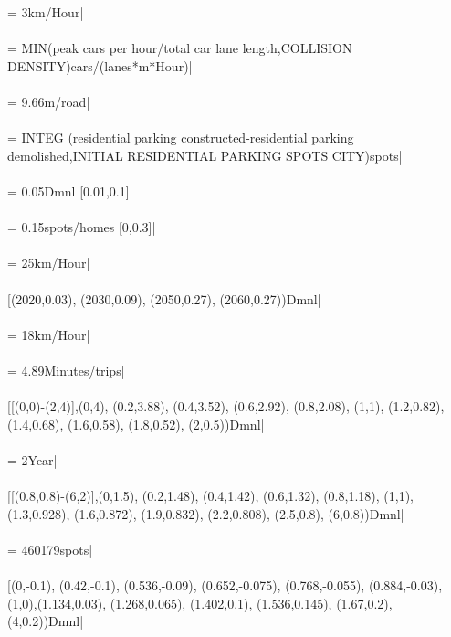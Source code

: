  = 3km/Hour| \\ \\ 
 = MIN(peak cars per hour/total car lane length,COLLISION DENSITY)cars/(lanes*m*Hour)| \\ \\ 
 = 9.66m/road| \\ \\ 
 =  INTEG (residential parking constructed-residential parking demolished,INITIAL RESIDENTIAL PARKING SPOTS CITY)spots| \\ \\ 
 = 0.05Dmnl [0.01,0.1]| \\ \\ 
 = 0.15spots/homes [0,0.3]| \\ \\ 
 = 25km/Hour| \\ \\ 
 [(2020,0.03), (2030,0.09), (2050,0.27), (2060,0.27))Dmnl| \\ \\ 
 = 18km/Hour| \\ \\ 
 = 4.89Minutes/trips| \\ \\ 
 [[(0,0)-(2,4)],(0,4), (0.2,3.88), (0.4,3.52), (0.6,2.92), (0.8,2.08), (1,1), (1.2,0.82), (1.4,0.68), (1.6,0.58), (1.8,0.52), (2,0.5))Dmnl| \\ \\ 
 = 2Year| \\ \\ 
 [[(0.8,0.8)-(6,2)],(0,1.5), (0.2,1.48), (0.4,1.42), (0.6,1.32), (0.8,1.18), (1,1), (1.3,0.928), (1.6,0.872), (1.9,0.832), (2.2,0.808), (2.5,0.8), (6,0.8))Dmnl| \\ \\ 
 = 460179spots| \\ \\ 
 [(0,-0.1), (0.42,-0.1), (0.536,-0.09), (0.652,-0.075), (0.768,-0.055), (0.884,-0.03), (1,0),(1.134,0.03), (1.268,0.065), (1.402,0.1), (1.536,0.145), (1.67,0.2), (4,0.2))Dmnl| \\ \\ 
